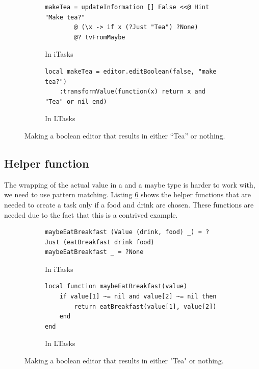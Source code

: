 \begin{figure}[ht]
\begin{subfigure}{\textwidth}
\centering
\begin{verbatim}
makeTea = updateInformation [] False <<@ Hint "Make tea?"
        @ (\x -> if x (?Just "Tea") ?None)
        @? tvFromMaybe
\end{verbatim}
\caption{In iTasks}
\label{lst:comparison_editors_clean}
\end{subfigure}
\begin{subfigure}{\textwidth}
\centering
\bigskip %
\begin{verbatim}
local makeTea = editor.editBoolean(false, "make tea?")
    :transformValue(function(x) return x and "Tea" or nil end)
\end{verbatim}
\caption{In LTasks}
\label{lst:comparison_editors_lua}
\end{subfigure}
\caption{Making a boolean editor that results in either ``Tea'' or nothing.}
\label{lst:comparison_editors}
\end{figure}

\subsection{Helper function}
The wrapping of the actual value in a  and a maybe type is harder to work with, we need to use pattern matching. Listing \ref{lst:comparison_maybe} shows the helper functions that are needed to create a  task only if a food and drink are chosen. These functions are needed due to the fact that this is a contrived example.

\begin{figure}[ht]
\begin{subfigure}{\textwidth}
\centering
\begin{verbatim}
maybeEatBreakfast (Value (drink, food) _) = ?Just (eatBreakfast drink food)
maybeEatBreakfast _ = ?None
\end{verbatim}
\caption{In iTasks}
\label{lst:comparison_maybe_clean}
\end{subfigure}
\begin{subfigure}{\textwidth}
\centering
\bigskip %
\begin{verbatim}
local function maybeEatBreakfast(value)
    if value[1] ~= nil and value[2] ~= nil then
        return eatBreakfast(value[1], value[2])
    end
end
\end{verbatim}
\caption{In LTasks}
\label{lst:comparison_maybe_lua}
\end{subfigure}
\caption{Making a boolean editor that results in either "Tea" or nothing.}
\label{lst:comparison_maybe}
\end{figure}

